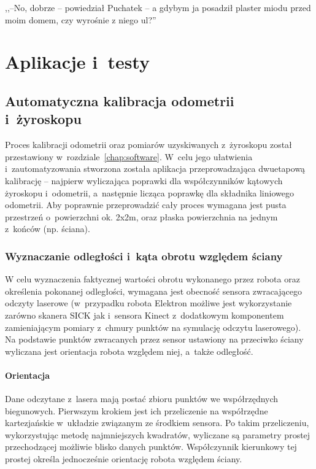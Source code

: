

\begin{savequote}[70mm]
,,--No, dobrze -- powiedział Puchatek -- a gdybym ja posadził plaster miodu przed moim domem, czy wyrośnie z niego ul?''
\end{savequote}


\chapter{Aplikacje i~testy}
\label{chap:aplikacje}

\section{Automatyczna kalibracja odometrii i~żyroskopu}

Proces kalibracji odometrii oraz pomiarów uzyskiwanych z~żyroskopu został
przestawiony w~rozdziale~\ref{chap:software}. W~celu jego ułatwienia
i~zautomatyzowania stworzona została aplikacja przeprowadzająca dwuetapową
kalibrację -- najpierw wyliczająca poprawki dla współczynników kątowych
żyroskopu i~odometrii, a~następnie licząca poprawkę dla składnika liniowego
odometrii. Aby poprawnie przeprowadzić cały proces wymagana jest pusta
przestrzeń o~powierzchni ok. 2x2m, oraz płaska powierzchnia na jednym z~końców
(np. ściana).

\subsection{Wyznaczanie odległości i~kąta obrotu względem ściany}

W celu wyznaczenia faktycznej wartości obrotu wykonanego przez robota oraz
określenia pokonanej odległości, wymagana jest obecność sensora zwracającego
odczyty laserowe (w~przypadku robota Elektron możliwe jest wykorzystanie
zarówno skanera SICK jak i~sensora Kinect z~dodatkowym komponentem
zamieniającym pomiary z~chmury punktów na symulację odczytu laserowego). Na
podstawie punktów zwracanych przez sensor ustawiony na przeciwko ściany
wyliczana jest orientacja robota względem niej, a~także odległość.

\subsubsection{Orientacja}

Dane odczytane z~lasera mają postać zbioru punktów we współrzędnych biegunowych.
Pierwszym krokiem jest ich przeliczenie na współrzędne kartezjańskie w~układzie
związanym ze środkiem sensora. Po takim przeliczeniu, wykorzystując metodę
najmniejszych kwadratów, wyliczane są parametry prostej przechodzącej możliwie
blisko danych punktów. Współczynnik kierunkowy tej prostej określa jednocześnie
orientację robota względem ściany.

